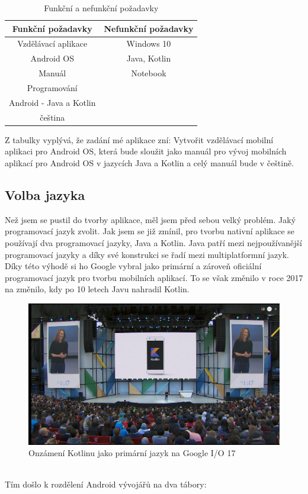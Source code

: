 \documentclass{vskpou} %
\begin{document}
\begin{table}[h]
\begin{center}
\begin{tabular}{ |c|c| }



\hline
{\centering}\textbf{Funkční požadavky}&
{\centering}\textbf{Nefunkční požadavky}
 \\
\hline
Vzdělávací aplikace&
Windows 10
 \\
\hline
Android OS&
Java, Kotlin
 \\
\hline
Manuál&
Notebook \\
\hline
Programování&
 \\
\hline
Android - Java a Kotlin&
 \\
\hline
čeština&
 \\
\hline


\end{tabular}
\caption{Funkční a nefunkční požadavky}
\end{center}
\end{table}


Z tabulky vyplývá, že zadání mé aplikace zní: Vytvořit vzdělávací mobilní aplikaci pro Android OS, která bude sloužit jako manuál pro vývoj mobilních aplikací pro Android OS v jazycích Java a Kotlin a celý manuál bude v češtině.
\newpage
\subsection{Volba jazyka}
Než jsem se pustil do tvorby aplikace, měl jsem před sebou velký problém. Jaký programovací jazyk zvolit. Jak jsem se již zmínil, pro tvorbu nativní aplikace se používají dva programovací jazyky, Java a Kotlin. Java patří mezi nejpoužívanější programovací jazyky a díky své konstrukci se řadí mezi multiplatformní jazyk. Díky této výhodě si ho Google vybral jako primární a zároveň oficiální programovací jazyk pro tvorbu mobilních aplikací. To se však změnilo v roce 2017 na změnilo, kdy po 10 letech Javu nahradil Kotlin.

 \begin{figure}[h!]
\centering
\includegraphics[scale=0.5]{images/16.jpg}
\caption{Onzámení Kotlinu jako primární jazyk na Google I/O 17}
\label{16}
\end{figure}
\\
Tím došlo k rozdělení Android vývojářů na dva tábory:\\
\end{document}
